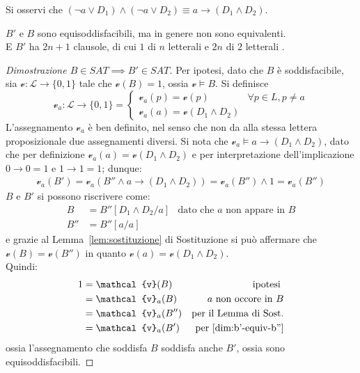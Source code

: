 Si osservi che $(\neg a \lor D_1) \land (\neg a \lor D_2) \equiv a \rightarrow (D_1 \land D_2)$. \\
\begin{lem}
$B'$ e $B$ sono equisoddisfacibili, ma in genere non sono equivalenti.\\
E $B'$ ha $2n + 1$ clausole, di cui $1$ di $n$ letterali e $2n$ di $2$ letterali .
\end{lem}
\begin{proof}[Dimostrazione $B \in SAT \implies B' \in SAT$]
        Per ipotesi, dato che $B$ è soddisfacibile, sia $\mathcal{v}:\mathscr{L} \rightarrow \{0,1\}$
        tale che $\mathcal{v}(B) = 1$, ossia $\mathcal{v} \models B$. 
        Si definisce 
        $$
        \mathcal{v}_a: \mathscr{L} \rightarrow \{0,1\} = 
        \begin{cases}
                \mathcal{v}_a(p) = \mathcal{v}(p) & \forall p \in L, p \neq a \\
                \mathcal{v}_a(a) = \mathcal{v}(D_1 \land D_2) 
        \end{cases} 
        $$
        L'assegnamento $\mathcal{v}_a$ è ben definito, nel senso che non 
        da alla stessa lettera proposizionale due assegnamenti diversi.
        Si nota che $\mathcal{v}_a \models a \rightarrow (D_1 \land D_2)$, 
        dato che per definizione $\mathcal{v}_a(a) = \mathcal{v}(D_1 \land D_2)$
        e per interpretazione dell'implicazione $0 \rightarrow 0 = 1$ e 
        $1 \rightarrow 1 = 1$; dunque:
        \begin{align}
        \label{dim:b'-equiv-b''}
        \mathcal{v}_a(B') = \mathcal{v}_a(B'' \land a \rightarrow (D_1 \land D_2)) = \mathcal{v}_a(B'') \land 1 = \mathcal{v}_a(B'')
        \end{align}
        $B$ e $B'$ si possono riscrivere come: 
        \begin{align*}
        B & = B''[D_1 \land D_2/a] & \text{dato che } a \text{ non appare in } B \\
        B'' & = B''[a/a]
        \end{align*}
        e grazie al Lemma~\ref{lem:sostituzione} di Sostituzione si può affermare che $\mathcal{v}(B) = \mathcal{v}(B'')$ in quanto $\mathcal{v}(a) = \mathcal{v}(D_1 \land D_2)$. \\
        Quindi:
        \begin{align*}
                1 &= \mathcal{v}(B) & \text{ipotesi } \\
                  &= \mathcal{v}_a(B) & a \text{ non occore in } B \\
                  &= \mathcal{v}_a(B'') & \text{per il Lemma di Sost.}  \\
                  &= \mathcal{v}_a(B') & \text{per~\ref{dim:b'-equiv-b''}}
        \end{align*}
        ossia l'assegnamento che soddisfa $B$ soddisfa anche $B'$, ossia 
        sono equisoddisfacibili. 
\end{proof}

